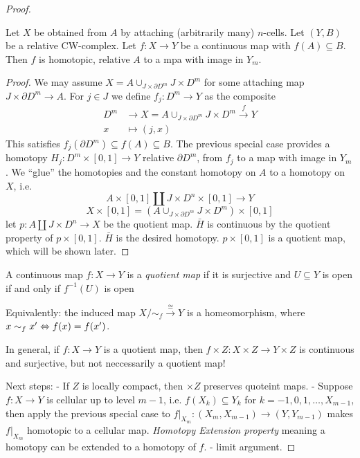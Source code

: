 \documentclass{TemplateLecture}
\begin{document}
\begin{proof}
    \begin{thm}{}{}
        Let \(X\) be obtained from \(A\) by attaching (arbitrarily many) \(n\)-cells. Let \((Y,B)\) be a relative CW-complex. Let \(f\colon X \to Y\) be a continuous map with \(f(A) \subseteq B\). Then \(f\) is homotopic, relative \(A\) to a mpa with image in \(Y_m\).
    \end{thm}
    \begin{proof}
        We may assume \(X = A \cup_{J\times \partial D^m} J\times D^m\) for some attaching map \(J\times \partial D^m \to A\). For \(j \in J\) we define \(f_j\colon D^m \to Y\) as the composite
        \[\begin{split}
            D^m &\to X = A\cup_{J\times \partial D^m} J\times D^m \xrightarrow{f} Y \\
            x &\mapsto (j,x)
        \end{split}\]
        This satisfies \(f_j(\partial D^m) \subseteq f(A) \subseteq B\).
        The previous special case provides a homotopy \(H_j\colon D^m \times [0,1] \to Y\) relative \(\partial D^m\), from \(f_j\) to a map with image in \(Y_m\).
        We \enquote{glue} the homotopies and the constant homotopy on \(A\) to a homotopy on \(X\), i.e.
        \[A\times [0,1] \amalg J\times D^n \times [0,1] \to Y\] %
        \[X\times [0,1] = (A\cup_{J\times \partial D^m} J\times D^m) \times [0,1]\]
        let \(p\colon A\amalg J\times D^n \to X\) be the quotient map.
        \(\bar H\) is continuous by the quotient property of \(p\times [0,1]\). \(\bar{H}\) is the desired homotopy. \(p\times [0,1]\) is a quotient map, which will be shown later.
    \end{proof}
    \begin{defi}
        A continuous map \(f\colon X\to Y\) is a \emph{quotient map} if it is surjective and \(U\subseteq Y\) is open if and only if \(f^{-1}(U)\) is open
    \end{defi}
    Equivalently: the induced map \(X/\sim_{f} \xrightarrow{\cong} Y\) is a homeomorphism, where \(x \sim_f x' \Leftrightarrow f(x) = f(x')\).

    In general, if \(f\colon X\to Y\) is a quotient map, then \(f\times Z\colon X\times Z \to Y\times Z\) is continuous and surjective, but not neccessarily a quotient map!

    Next steps:  - If \(Z\) is locally compact, then \(\times Z\) preserves quoteint maps.
    - Suppose \(f\colon X\to Y\) is cellular up to level \(m-1\), i.e. \(f(X_k) \subseteq Y_k\) for \(k = -1, 0, 1, \dots, X_{m-1}\), then apply the previous special case to \(f\rvert_{X_m} \colon (X_m, X_{m-1}) \to (Y, Y_{m-1})\) makes \(f\rvert_{X_m}\) homotopic to a cellular map. \emph{Homotopy Extension property} meaning a homotopy can be extended to a homotopy of \(f\).
    - limit argument.


\end{proof}
\end{document}
